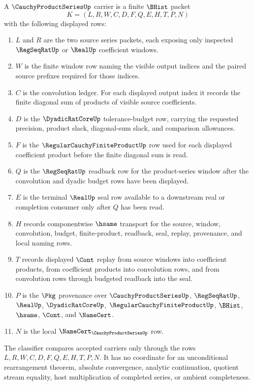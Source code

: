 \begin{definition}
\label{def:cauchy-product-series-carrier}
A $\CauchyProductSeriesUp$ carrier is a finite $\BHist$ packet
$$
K=(L,R,W,C,D,F,Q,E,H,T,P,N)
$$
with the following displayed rows:
\begin{enumerate}
\item $L$ and $R$ are the two source series packets, each exposing only inspected $\RegSeqRatUp$ or $\RealUp$ coefficient windows.
\item $W$ is the finite window row naming the visible output indices and the paired source prefixes required for those indices.
\item $C$ is the convolution ledger. For each displayed output index it records the finite diagonal sum of products of visible source coefficients.
\item $D$ is the $\DyadicRatCoreUp$ tolerance-budget row, carrying the requested precision, product slack, diagonal-sum slack, and comparison allowances.
\item $F$ is the $\RegularCauchyFiniteProductUp$ row used for each displayed coefficient product before the finite diagonal sum is read.
\item $Q$ is the $\RegSeqRatUp$ readback row for the product-series window after the convolution and dyadic budget rows have been displayed.
\item $E$ is the terminal $\RealUp$ seal row available to a downstream real or completion consumer only after $Q$ has been read.
\item $H$ records componentwise $\hsame$ transport for the source, window, convolution, budget, finite-product, readback, seal, replay, provenance, and local naming rows.
\item $T$ records displayed $\Cont$ replay from source windows into coefficient products, from coefficient products into convolution rows, and from convolution rows through budgeted readback into the seal.
\item $P$ is the $\Pkg$ provenance over $\CauchyProductSeriesUp$, $\RegSeqRatUp$, $\RealUp$, $\DyadicRatCoreUp$, $\RegularCauchyFiniteProductUp$, $\BHist$, $\hsame$, $\Cont$, and $\NameCert$.
\item $N$ is the local $\NameCert_{\CauchyProductSeriesUp}$ row.
\end{enumerate}
The classifier compares accepted carriers only through the rows $L,R,W,C,D,F,Q,E,H,T,P,N$. It has no coordinate for an unconditional rearrangement theorem, absolute convergence, analytic continuation, quotient stream equality, host multiplication of completed series, or ambient completeness.
\end{definition}

